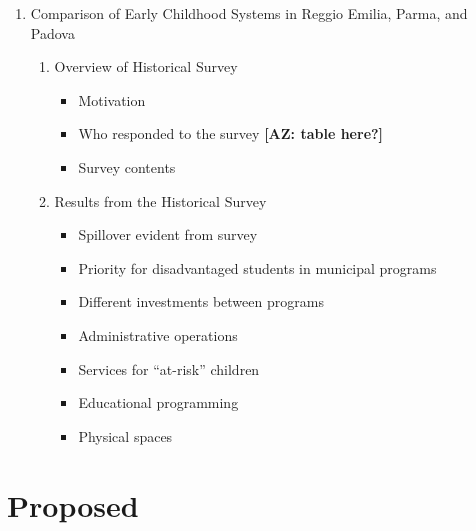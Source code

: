 \documentclass{article}
\begin{document}
\begin{enumerate}
	\item Comparison of Early Childhood Systems in Reggio Emilia, Parma, and Padova
		\begin{enumerate}
		\item Overview of Historical Survey
			\begin{itemize}
			\item Motivation
			\item Who responded to the survey \textbf{[AZ: table here?]}
			\item Survey contents
			\end{itemize}
		\item Results from the Historical Survey
			\begin{itemize}
			\item Spillover evident from survey
			\item Priority for disadvantaged students in municipal programs
			\item Different investments between programs 
			\item Administrative operations
			\item Services for ``at-risk'' children 
			\item Educational programming
			\item Physical spaces
			\end{itemize}
		\end{enumerate}
\end{enumerate}

\section{Proposed}
\end{document}
